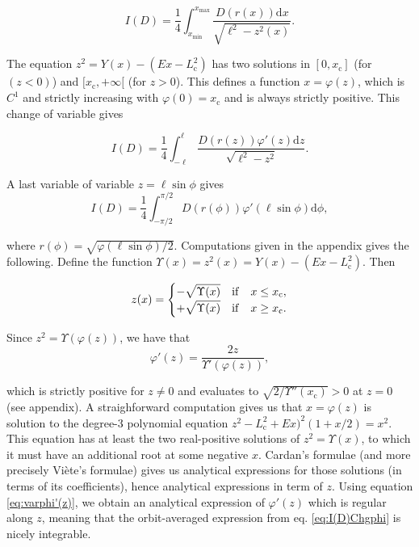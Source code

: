 \documentclass[11pt]{article}
\newcommand{\rc}{\mathrm{c}}
\newcommand{\rd}{{\mathrm{d}}}
\newcommand{\Lc}{L_{{\mathrm{c}}}}
\newcommand{\xc}{x_{\rc}}
\begin{document}
\begin{equation}
 I(D) = \frac{1}{4}\int_{x_{\min}}^{x_{\max}}  \frac{D(r(x))\rd x}{\sqrt{\ell^{2}-z^{2}(x)}} .
  \label{eq:I(D)ChgX_Z}
\end{equation}

The equation  $z^{2}=Y(x)-(E x - \Lc^{2})$ has two solutions in $[0,\xc]$ (for $(z<0)$) and $[\xc,+\infty[$ (for $z>0$). This defines a function $x=\varphi(z)$, which is $C^{1}$ and strictly increasing with $\varphi(0)=\xc$ and is always strictly positive. This change of variable gives

\begin{equation}
 I(D) = \frac{1}{4}\int_{-\ell}^{\ell}  \frac{D(r(z))\varphi'(z)\rd z}{\sqrt{\ell^{2}-z^{2}}} .
 \label{eq:I(D)Chgz}
\end{equation}

A last variable of variable $z=\ell\sin\phi$ gives
\begin{equation}
I(D) = \frac{1}{4}\int_{-\pi/2}^{\pi/2}  D(r(\phi))\varphi'(\ell\sin\phi)\rd \phi ,
\label{eq:I(D)Chgphi}
\end{equation}

where $r(\phi)=\sqrt{\varphi(\ell\sin\phi)/2}$. Computations given in the appendix gives the following. Define the function $\Upsilon(x)=z^{2}(x)=Y(x)-(E x-\Lc^{2})$. Then

\begin{equation}
  z(x)=\begin{cases}
\displaystyle{ -\sqrt{\Upsilon(x)}} & {\rm{if}} \quad x\leq\xc ,\\
\displaystyle{ +\sqrt{\Upsilon(x)}} &{\rm{if}} \quad x\geq\xc .
\end{cases}
  \label{eq:z(x)}
\end{equation}

Since $z^{2}=\Upsilon(\varphi(z))$, we have that
\begin{equation}
\varphi'(z) = \frac{2 z}{\Upsilon'(\varphi(z))} ,
  \label{eq:varphi'(z)}
\end{equation}

which is strictly positive for $z\neq0$ and evaluates to $\sqrt{2/\Upsilon''(\xc)}>0$ at $z=0$ (see appendix). A straighforward computation gives us that $x=\varphi(z)$ is solution to the degree-3 polynomial equation $z^{2}-\Lc^{2} + Ex)^{2}(1+x/2)=x^{2}$. This equation has at least the two real-positive solutions of $z^{2}=\Upsilon(x)$, to which it must have an additional root at some negative $x$. Cardan's formulae (and more precisely Viète's formulae) gives us analytical expressions for those solutions (in terms of its coefficients), hence analytical expressions in term of $z$. Using equation \eqref{eq:varphi'(z)}, we obtain an analytical expression of $\varphi'(z)$ which is regular along $z$, meaning that the orbit-averaged expression from eq. \eqref{eq:I(D)Chgphi} is nicely integrable.
\end{document}
